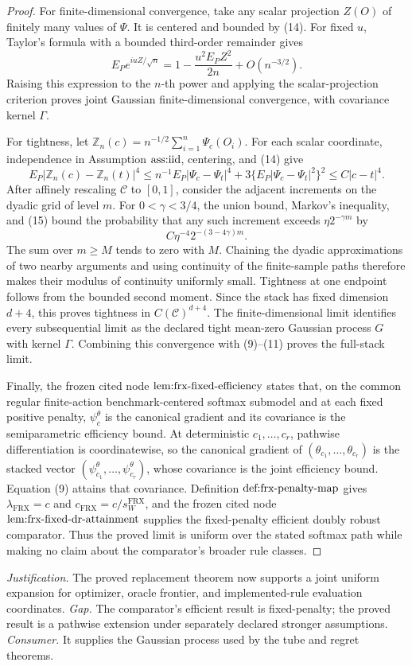 \documentclass{article}
\begin{document}
\begin{proof}
For finite-dimensional convergence, take any scalar projection \(Z(O)\) of finitely many values of \(\Psi\).  It is centered and bounded by (14).  For fixed \(u\), Taylor's formula with a bounded third-order remainder gives
\[
 E_Pe^{iuZ/\sqrt n}
 =1-\frac{u^2E_PZ^2}{2n}+O(n^{-3/2}).
\]
Raising this expression to the \(n\)-th power and applying the scalar-projection criterion proves joint Gaussian finite-dimensional convergence, with covariance kernel \(\Gamma\).

For tightness, let \(\mathbb Z_n(c)=n^{-1/2}\sum_{i=1}^n\Psi_c(O_i)\).  For each scalar coordinate, independence in Assumption \(\textnormal{ass:iid}\), centering, and (14) give
\[
 E_P|\mathbb Z_n(c)-\mathbb Z_n(t)|^4
 \le n^{-1}E_P|\Psi_c-\Psi_t|^4
 +3\{E_P|\Psi_c-\Psi_t|^2\}^2
 \le C|c-t|^4. \tag{15}
\]
After affinely rescaling \(\mathcal C\) to \([0,1]\), consider the adjacent increments on the dyadic grid of level \(m\).  For \(0<\gamma<3/4\), the union bound, Markov's inequality, and (15) bound the probability that any such increment exceeds \(\eta2^{-\gamma m}\) by
\[
 C\eta^{-4}2^{-(3-4\gamma)m}.
\]
The sum over \(m\ge M\) tends to zero with \(M\).  Chaining the dyadic approximations of two nearby arguments and using continuity of the finite-sample paths therefore makes their modulus of continuity uniformly small.  Tightness at one endpoint follows from the bounded second moment.  Since the stack has fixed dimension \(d+4\), this proves tightness in \(C(\mathcal C)^{d+4}\).  The finite-dimensional limit identifies every subsequential limit as the declared tight mean-zero Gaussian process \(G\) with kernel \(\Gamma\).  Combining this convergence with (9)--(11) proves the full-stack limit.

Finally, the frozen cited node \(\textnormal{lem:frx-fixed-efficiency}\) states that, on the common regular finite-action benchmark-centered softmax submodel and at each fixed positive penalty, \(\psi_c^\theta\) is the canonical gradient and its covariance is the semiparametric efficiency bound.  At deterministic \(c_1,\ldots,c_r\), pathwise differentiation is coordinatewise, so the canonical gradient of \((\theta_{c_1},\ldots,\theta_{c_r})\) is the stacked vector \((\psi_{c_1}^\theta,\ldots,\psi_{c_r}^\theta)\), whose covariance is the joint efficiency bound.  Equation (9) attains that covariance.  Definition \(\textnormal{def:frx-penalty-map}\) gives \(\lambda_{\mathrm{FRX}}=c\) and \(c_{\mathrm{FRX}}=c/s_W^{\mathrm{FRX}}\), and the frozen cited node \(\textnormal{lem:frx-fixed-dr-attainment}\) supplies the fixed-penalty efficient doubly robust comparator.  Thus the proved limit is uniform over the stated softmax path while making no claim about the comparator's broader rule classes.
\end{proof}
\par\smallskip\noindent \textit{Justification.} The proved replacement theorem now supports a joint uniform expansion for optimizer, oracle frontier, and implemented-rule evaluation coordinates. \textit{Gap.} The comparator's efficient result is fixed-penalty; the proved result is a pathwise extension under separately declared stronger assumptions. \textit{Consumer.} It supplies the Gaussian process used by the tube and regret theorems.
\end{document}
